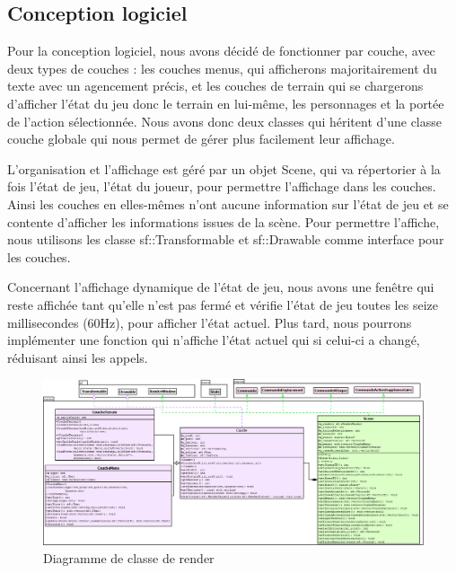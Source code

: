 \documentclass[a4paper,12pt]{article}
\begin{document}
\subsection{Conception logiciel}

Pour la conception logiciel, nous avons décidé de fonctionner par couche, avec deux types de couches : les couches menus, qui afficherons majoritairement du texte avec un agencement précis, et les couches de terrain qui se chargerons d'afficher l'état du jeu donc le terrain en lui-même, les personnages et la portée de l'action sélectionnée. Nous avons donc deux classes qui héritent d'une classe couche globale qui nous permet de gérer plus facilement leur affichage.

L'organisation et l'affichage est géré par un objet Scene, qui va répertorier à la fois l'état de jeu, l'état du joueur, pour permettre l'affichage dans les couches. Ainsi les couches en elles-mêmes n'ont aucune information sur l'état de jeu et se contente d'afficher les informations issues de la scène. Pour permettre l'affiche, nous utilisons les classe sf::Transformable et sf::Drawable comme interface pour les couches.

Concernant l'affichage dynamique de l'état de jeu, nous avons une fenêtre qui reste affichée tant qu'elle n'est pas fermé et vérifie l'état de jeu toutes les seize millisecondes (60Hz), pour afficher l'état actuel. Plus tard, nous pourrons implémenter une fonction qui n'affiche l'état actuel qui si celui-ci a changé, réduisant ainsi les appels.


\begin{figure}[hbt!]
    \centering
    \includegraphics[width =.8\paperwidth, angle=0]{images/render.png}
    \caption{Diagramme de classe de render}
    \label{fig:render}
\end{figure}



\end{document}
